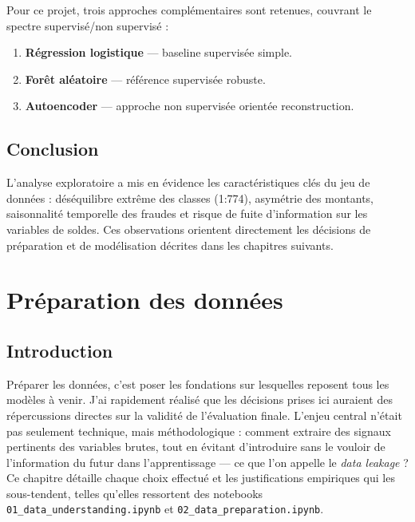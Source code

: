 \documentclass[12pt,a4paper,twoside]{report}
\begin{document}
Pour ce projet, trois approches complémentaires sont retenues, couvrant le spectre supervisé/non supervisé :

\begin{enumerate}
  \item \textbf{Régression logistique} --- baseline supervisée simple.
  \item \textbf{Forêt aléatoire} --- référence supervisée robuste.
  \item \textbf{Autoencoder} --- approche non supervisée orientée reconstruction.
\end{enumerate}

\section{Conclusion}

L'analyse exploratoire a mis en évidence les caractéristiques clés du jeu de données : déséquilibre extrême des classes (1:774), asymétrie des montants, saisonnalité temporelle des fraudes et risque de fuite d'information sur les variables de soldes. Ces observations orientent directement les décisions de préparation et de modélisation décrites dans les chapitres suivants.

\chapter{Préparation des données}

\section{Introduction}

Préparer les données, c'est poser les fondations sur lesquelles reposent tous les modèles à venir. J'ai rapidement réalisé que les décisions prises ici auraient des répercussions directes sur la validité de l'évaluation finale. L'enjeu central n'était pas seulement technique, mais méthodologique : comment extraire des signaux pertinents des variables brutes, tout en évitant d'introduire sans le vouloir de l'information du futur dans l'apprentissage --- ce que l'on appelle le \textit{data leakage} ? Ce chapitre détaille chaque choix effectué et les justifications empiriques qui les sous-tendent, telles qu'elles ressortent des notebooks \texttt{01\_data\_understanding.ipynb} et \texttt{02\_data\_preparation.ipynb}.
\end{document}
